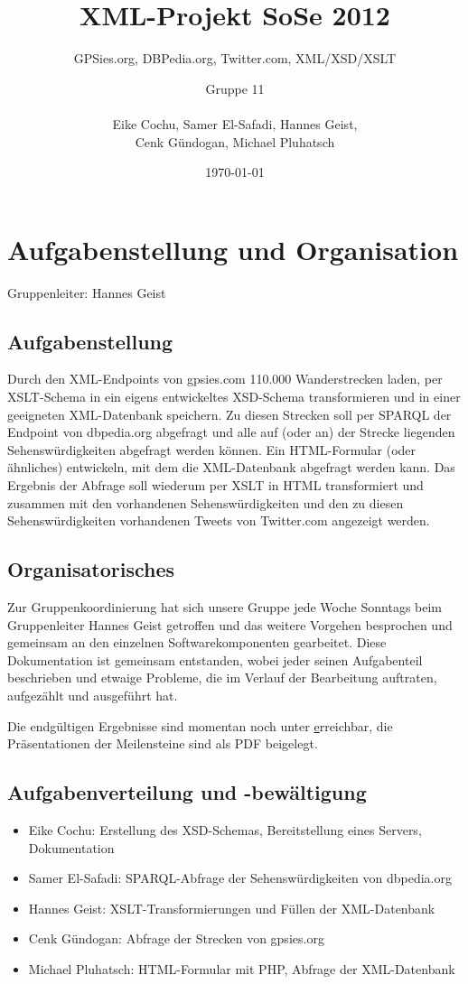 \documentclass[10pt,a4paper]{scrartcl}
\title{XML-Projekt SoSe 2012}
\subtitle{GPSies.org, DBPedia.org, Twitter.com, XML/XSD/XSLT\vspace*{.7cm}}
\author{Gruppe 11\\\hfill\\Eike Cochu, Samer El-Safadi, Hannes Geist,\\Cenk Gündogan, Michael Pluhatsch}
\date{\today}
\begin{document}
\maketitle
\thispagestyle{empty}
\vspace*{2cm}
\tableofcontents
\newpage
\renewcommand{\baselinestretch}{1.5}
\selectfont

\section{Aufgabenstellung und Organisation}
Gruppenleiter: Hannes Geist

\subsection{Aufgabenstellung}
Durch den XML-Endpoints von gpsies.com 110.000 Wanderstrecken laden, per XSLT-Schema in ein eigens entwickeltes XSD-Schema transformieren und in einer geeigneten XML-Datenbank speichern. Zu diesen Strecken soll per SPARQL der Endpoint von dbpedia.org abgefragt und alle auf (oder an) der Strecke liegenden Sehenswürdigkeiten abgefragt werden können. Ein HTML-Formular (oder ähnliches) entwickeln, mit dem die XML-Datenbank abgefragt werden kann. Das Ergebnis der Abfrage soll wiederum per XSLT in HTML transformiert und zusammen mit den vorhandenen Sehenswürdigkeiten und den zu diesen Sehenswürdigkeiten vorhandenen Tweets von Twitter.com angezeigt werden.

\subsection{Organisatorisches}
Zur Gruppenkoordinierung hat sich unsere Gruppe jede Woche Sonntags beim Gruppenleiter Hannes Geist getroffen und das weitere Vorgehen besprochen und gemeinsam an den einzelnen Softwarekomponenten gearbeitet. Diese Dokumentation ist gemeinsam entstanden, wobei jeder seinen Aufgabenteil beschrieben und etwaige Probleme, die im Verlauf der Bearbeitung auftraten, aufgezählt und ausgeführt hat.

Die endgültigen Ergebnisse sind momentan noch unter \href{http://cochu.dyndns.org/xml} erreichbar, die Präsentationen der Meilensteine sind als PDF beigelegt.

\subsection{Aufgabenverteilung und -bewältigung}
\begin{itemize}
\item Eike Cochu: Erstellung des XSD-Schemas, Bereitstellung eines Servers, Dokumentation
\item Samer El-Safadi: SPARQL-Abfrage der Sehenswürdigkeiten von dbpedia.org
\item Hannes Geist: XSLT-Transformierungen und Füllen der XML-Datenbank
\item Cenk Gündogan: Abfrage der Strecken von gpsies.org 
\item Michael Pluhatsch: HTML-Formular mit PHP, Abfrage der XML-Datenbank
\end{itemize}
\end{document}
